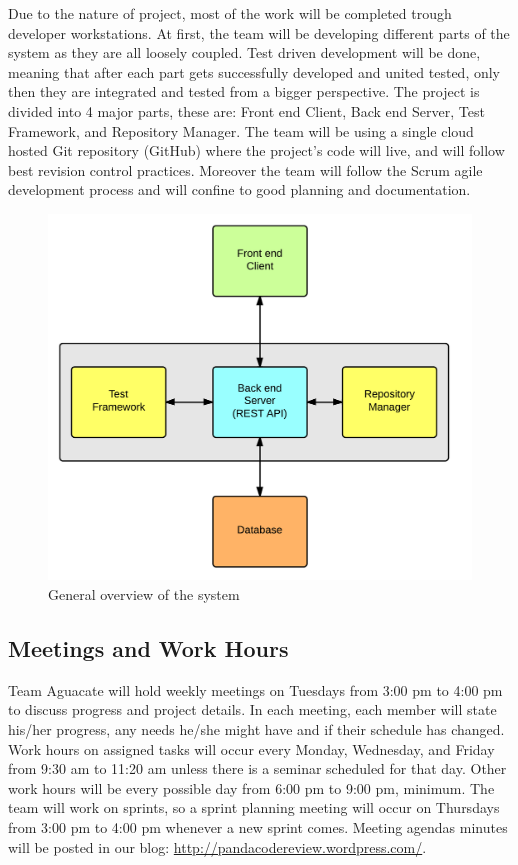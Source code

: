 
Due to the nature of project, most of the work will be completed trough
developer workstations. At first, the team will be developing different parts of
the system as they are all loosely coupled. Test driven development will be
done, meaning that after each part gets successfully developed and united
tested, only then they are integrated and tested from a bigger perspective. The
project is divided into 4 major parts, these are: Front end Client, Back end
Server, Test Framework, and Repository Manager. The team will be using a single
cloud hosted Git repository (GitHub) where the project's code will live, and
will follow best revision control practices. Moreover the team will follow the
Scrum agile development process and will confine to good planning and
documentation.

\begin{figure}[H]
	\centering
	\includegraphics[width=\textwidth]{img/bigArquitectOverview}
	\caption{General overview of the system}
\end{figure}

\subsection{Meetings and Work Hours}

Team Aguacate will hold weekly meetings on Tuesdays from 3:00 pm to 4:00 pm to
discuss progress and project details. In each meeting, each member will state
his/her progress, any needs he/she might have and if their schedule has changed.
Work hours on assigned tasks will occur every Monday, Wednesday, and Friday from
9:30 am to 11:20 am unless there is a seminar scheduled for that day. Other work
hours will be every possible day from 6:00 pm to 9:00 pm, minimum. The team will
work on sprints, so a sprint planning meeting will occur on Thursdays from 3:00
pm to 4:00 pm whenever a new sprint comes. Meeting agendas minutes will be
posted in our blog: \url{http://pandacodereview.wordpress.com/}.

